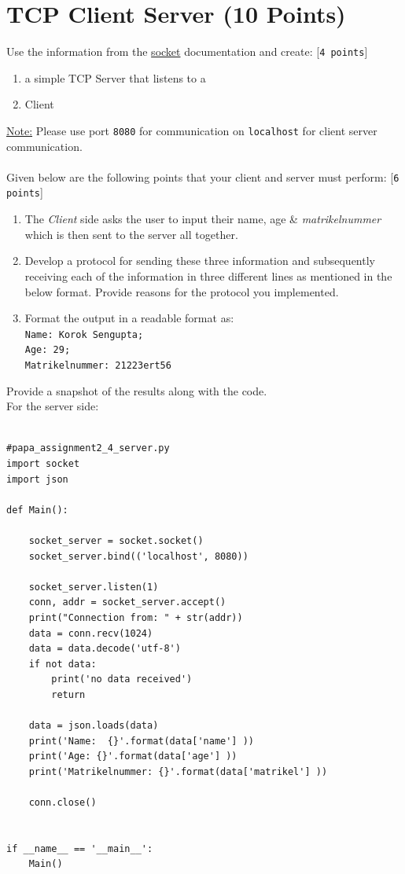 \documentclass{WeSTassignment}
\begin{document}

\section{TCP Client Server (10 Points)}

Use the information from the \href{https://docs.python.org/3/howto/sockets.html}{socket} documentation and create: [\texttt{4 points}]
\begin{enumerate}
\item a simple TCP Server that listens to a
\item Client
\end{enumerate}
\underline{Note:} Please use port \texttt{8080} for communication on \texttt{localhost} for client server communication.\\ \\
Given below are the following points that your client and server must perform: [\texttt{6 points}]
\begin{enumerate}
\item The \emph{Client} side asks the user to input their name, age \& \emph{matrikelnummer} which is then sent to the server all together.
\item Develop a protocol for sending these three information and subsequently receiving each of the information in three different lines as mentioned in the below format. Provide reasons for the protocol you implemented. 
\item Format the output in a readable format as:\texttt{\\ Name: Korok Sengupta; \\ Age: 29; \\ Matrikelnummer: 21223ert56}
\end{enumerate}

Provide a snapshot of the results along with the code. \\


For the server side:\\ \\
\begin{lstlisting}
#papa_assignment2_4_server.py
import socket
import json

def Main():

    socket_server = socket.socket()
    socket_server.bind(('localhost', 8080))

    socket_server.listen(1)
    conn, addr = socket_server.accept()
    print("Connection from: " + str(addr))
    data = conn.recv(1024)
    data = data.decode('utf-8')
    if not data:
        print('no data received')
        return

    data = json.loads(data)
    print('Name:  {}'.format(data['name'] ))
    print('Age: {}'.format(data['age'] ))
    print('Matrikelnummer: {}'.format(data['matrikel'] ))

    conn.close()


if __name__ == '__main__':
    Main()
\end{lstlisting}
\end{document}

